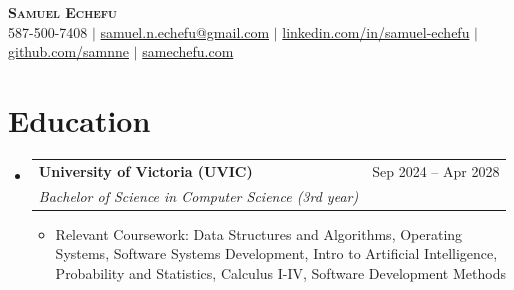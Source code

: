 \documentclass[letterpaper,10pt]{article}
\makeatletter
\newcommand{\resumeItem}[1]{
  \item\small{
    {#1 \vspace{-1pt}}
  }
}
\newcommand{\resumeSubheading}[4]{
  \vspace{-2pt}\item
    \begin{tabular*}{0.97\textwidth}[t]{l@{\extracolsep{\fill}}r}
      \textbf{#1} & #2 \\
      \textit{\small#3} & \textit{\small #4} \\
    \end{tabular*}\vspace{-6pt}
}
\newcommand{\resumeSubHeadingListStart}{\begin{itemize}[leftmargin=0.15in, label={}]}
\newcommand{\resumeSubHeadingListEnd}{\end{itemize}}
\newcommand{\resumeItemListStart}{\begin{itemize}[label=$\bullet$, itemsep=0pt, topsep=0pt, parsep=0pt]}
\newcommand{\resumeItemListEnd}{\end{itemize}\vspace{-2pt}}
\makeatother
\begin{document}
\begin{center}
    \textbf{\Huge \scshape Samuel Echefu} \\ \vspace{5pt}
    \small 587-500-7408 $|$ \href{mailto:samuel.n.echefu@gmail.com}{samuel.n.echefu@gmail.com} $|$ 
    \href{https://linkedin.com/in/samuel-echefu-251a21336}{linkedin.com/in/samuel-echefu} $|$
    \href{https://github.com/samnne}{github.com/samnne} $|$
    \href{https://samechefu.com}{samechefu.com}
\end{center}


\section{Education}
\resumeSubHeadingListStart
  \resumeSubheading
    {University of Victoria (UVIC)}{Sep 2024 -- Apr 2028}
    {Bachelor of Science in Computer Science (3rd year)}{}
\resumeItemListStart
  \resumeItem{Relevant Coursework: Data Structures and Algorithms, Operating Systems, Software Systems Development, Intro to Artificial Intelligence, Probability and Statistics, Calculus I-IV, Software Development Methods}
\resumeItemListEnd
\resumeSubHeadingListEnd

\end{document}
